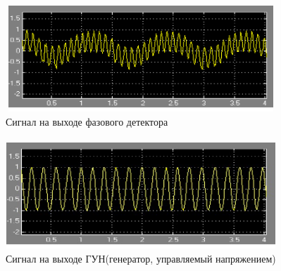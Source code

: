 \documentclass[10pt,a4paper]{article}
\begin{document}
\begin{enumerate}
\includegraphics[width=4in,height=40mm]{r93}
\\
Сигнал на выходе фазового детектора
\\
\\
\includegraphics[width=4in,height=40mm]{r94}
\\
Сигнал на выходе ГУН(генератор, управляемый напряжением)
\\
\\
\end{enumerate}
\end{document}
